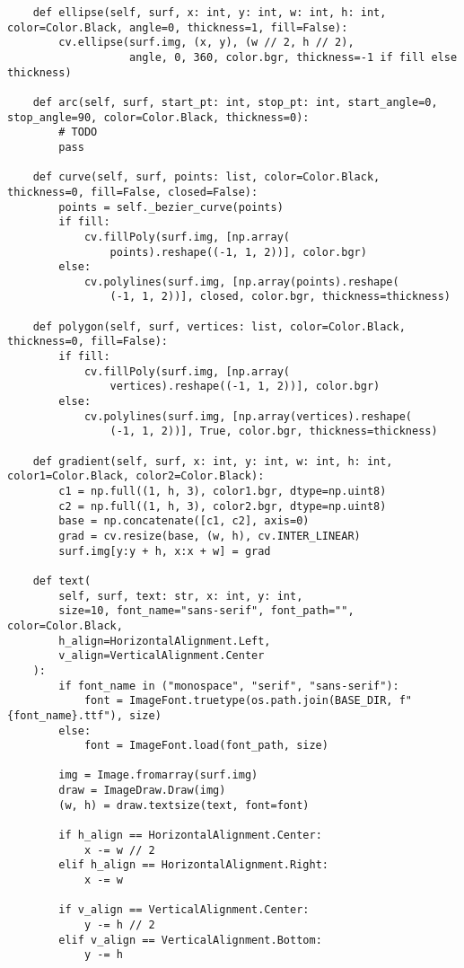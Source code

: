 \documentclass[11pt]{article}
\begin{document}
\begin{lstlisting}
    def ellipse(self, surf, x: int, y: int, w: int, h: int, color=Color.Black, angle=0, thickness=1, fill=False):
        cv.ellipse(surf.img, (x, y), (w // 2, h // 2),
                   angle, 0, 360, color.bgr, thickness=-1 if fill else thickness)

    def arc(self, surf, start_pt: int, stop_pt: int, start_angle=0, stop_angle=90, color=Color.Black, thickness=0):
        # TODO
        pass

    def curve(self, surf, points: list, color=Color.Black, thickness=0, fill=False, closed=False):
        points = self._bezier_curve(points)
        if fill:
            cv.fillPoly(surf.img, [np.array(
                points).reshape((-1, 1, 2))], color.bgr)
        else:
            cv.polylines(surf.img, [np.array(points).reshape(
                (-1, 1, 2))], closed, color.bgr, thickness=thickness)

    def polygon(self, surf, vertices: list, color=Color.Black, thickness=0, fill=False):
        if fill:
            cv.fillPoly(surf.img, [np.array(
                vertices).reshape((-1, 1, 2))], color.bgr)
        else:
            cv.polylines(surf.img, [np.array(vertices).reshape(
                (-1, 1, 2))], True, color.bgr, thickness=thickness)

    def gradient(self, surf, x: int, y: int, w: int, h: int, color1=Color.Black, color2=Color.Black):
        c1 = np.full((1, h, 3), color1.bgr, dtype=np.uint8)
        c2 = np.full((1, h, 3), color2.bgr, dtype=np.uint8)
        base = np.concatenate([c1, c2], axis=0)
        grad = cv.resize(base, (w, h), cv.INTER_LINEAR)
        surf.img[y:y + h, x:x + w] = grad

    def text(
        self, surf, text: str, x: int, y: int,
        size=10, font_name="sans-serif", font_path="", color=Color.Black,
        h_align=HorizontalAlignment.Left,
        v_align=VerticalAlignment.Center
    ):
        if font_name in ("monospace", "serif", "sans-serif"):
            font = ImageFont.truetype(os.path.join(BASE_DIR, f"{font_name}.ttf"), size)
        else:
            font = ImageFont.load(font_path, size)

        img = Image.fromarray(surf.img)
        draw = ImageDraw.Draw(img)
        (w, h) = draw.textsize(text, font=font)

        if h_align == HorizontalAlignment.Center:
            x -= w // 2
        elif h_align == HorizontalAlignment.Right:
            x -= w

        if v_align == VerticalAlignment.Center:
            y -= h // 2
        elif v_align == VerticalAlignment.Bottom:
            y -= h


\end{lstlisting}
\end{document}
